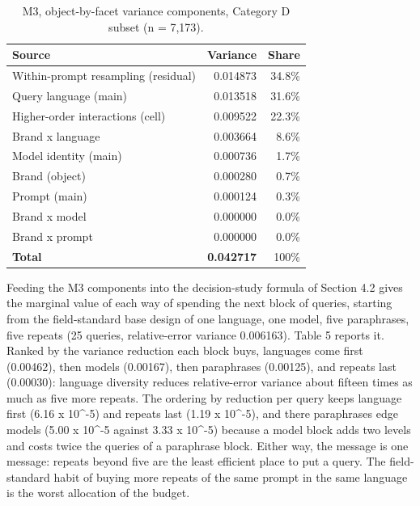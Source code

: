 \documentclass[pdflatex,sn-mathphys-num]{sn-jnl}
\begin{document}
\begin{table}[htbp]
\caption{M3, object-by-facet variance components, Category D subset (n = 7,173).}
\small
\begin{tabularx}{\textwidth}{@{}>{\raggedright\arraybackslash}Xrr@{}}
\toprule
Source & Variance & Share \\
\midrule

Within-prompt resampling (residual) & 0.014873 & 34.8\% \\
Query language (main) & 0.013518 & 31.6\% \\
Higher-order interactions (cell) & 0.009522 & 22.3\% \\
Brand x language & 0.003664 & 8.6\% \\
Model identity (main) & 0.000736 & 1.7\% \\
Brand (object) & 0.000280 & 0.7\% \\
Prompt (main) & 0.000124 & 0.3\% \\
Brand x model & 0.000000 & 0.0\% \\
Brand x prompt & 0.000000 & 0.0\% \\
\textbf{Total} & \textbf{0.042717} & 100\% \\
\bottomrule
\end{tabularx}
\end{table}

Feeding the M3 components into the decision-study formula of Section 4.2 gives the marginal value of each way of spending the next block of queries, starting from the field-standard base design of one language, one model, five paraphrases, five repeats (25 queries, relative-error variance 0.006163). Table 5 reports it. Ranked by the variance reduction each block buys, languages come first (0.00462), then models (0.00167), then paraphrases (0.00125), and repeats last (0.00030): language diversity reduces relative-error variance about fifteen times as much as five more repeats. The ordering by reduction per query keeps language first (6.16 x 10\^{}-5) and repeats last (1.19 x 10\^{}-5), and there paraphrases edge models (5.00 x 10\^{}-5 against 3.33 x 10\^{}-5) because a model block adds two levels and costs twice the queries of a paraphrase block. Either way, the message is one message: repeats beyond five are the least efficient place to put a query. The field-standard habit of buying more repeats of the same prompt in the same language is the worst allocation of the budget.
\end{document}
